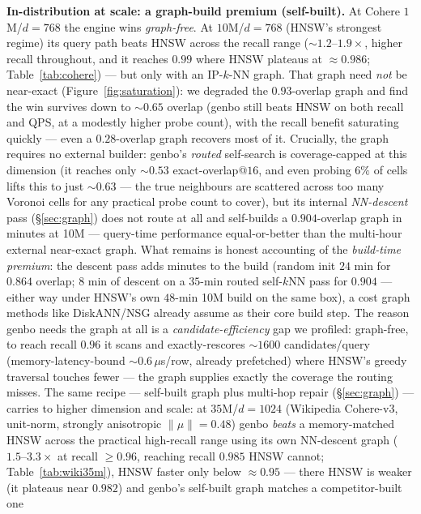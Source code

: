 \documentclass{article}
\begin{document}
\textbf{In-distribution at scale: a graph-build premium (self-built).} At Cohere $1$M/$d{=}768$
the engine wins \emph{graph-free}. At $10$M/$d{=}768$ (HNSW's strongest regime) its query path
beats HNSW across the recall range (${\sim}1.2$--$1.9\times$, higher recall throughout, and it
reaches $0.99$ where HNSW plateaus at $\approx\!0.986$; Table~\ref{tab:cohere}) --- but only with
an IP-$k$-NN graph. That graph need \emph{not} be near-exact (Figure~\ref{fig:saturation}): we degraded the
$0.93$-overlap graph and find the win survives down to ${\sim}0.65$ overlap (genbo still beats HNSW
on both recall and QPS, at a modestly higher probe count), with the recall benefit saturating
quickly --- even a $0.28$-overlap graph recovers most of it. Crucially, the graph requires
no external builder: genbo's \emph{routed} self-search is coverage-capped at this dimension (it
reaches only ${\sim}0.53$ exact-overlap@$16$, and even probing $6\%$ of cells lifts this to just
${\sim}0.63$ --- the true neighbours are scattered across too many Voronoi cells for any practical
probe count to cover), but its internal \emph{NN-descent} pass (\S\ref{sec:graph}) does not route
at all and self-builds a $0.904$-overlap graph in minutes at 10M --- query-time performance
equal-or-better than the multi-hour external near-exact graph. What remains is
honest accounting of the \emph{build-time premium}: the descent pass adds minutes to the build
(random init $24$ min for $0.864$ overlap; $8$ min of descent on a $35$-min routed
self-$k$NN pass for $0.904$ --- either way under HNSW's own $48$-min 10M build on the same box), a cost graph methods like DiskANN/NSG
already assume as their core build step. The reason genbo needs the graph at all is a
\emph{candidate-efficiency} gap we profiled: graph-free, to reach recall
$0.96$ it scans and exactly-rescores ${\sim}1600$ candidates/query (memory-latency-bound
${\sim}0.6\,\mu$s/row, already prefetched) where HNSW's greedy traversal touches fewer --- the
graph supplies exactly the coverage the routing misses. The same recipe --- self-built
graph plus multi-hop repair (\S\ref{sec:graph}) --- carries to higher dimension and scale:
at $35$M/$d{=}1024$
(Wikipedia Cohere-v3, unit-norm, strongly anisotropic $\lVert\mu\rVert{=}0.48$) genbo
\emph{beats} a memory-matched HNSW across the practical high-recall range using its own
NN-descent graph ($1.5\text{--}3.3\times$ at recall $\ge\!0.96$, reaching recall $0.985$ HNSW
cannot; Table~\ref{tab:wiki35m}), HNSW faster only below $\approx\!0.95$ --- there HNSW is weaker
(it plateaus near $0.982$) and genbo's self-built graph matches a competitor-built one
\end{document}
